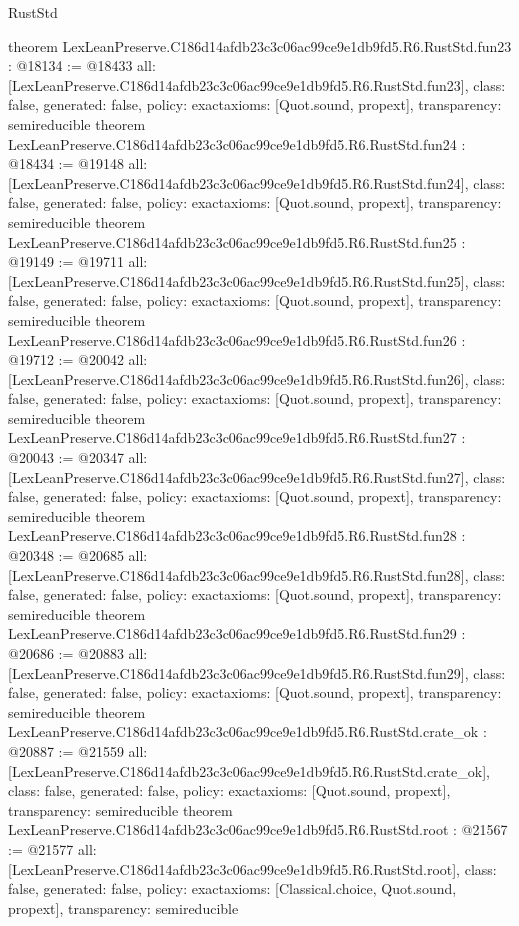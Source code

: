 \begin{lexlean}{RustStd}
\begin{coremodule}
{}
theorem LexLeanPreserve.C186d14afdb23c3c06ac99ce9e1db9fd5.R6.RustStd.fun23 : @18134 := @18433 {
  all: [LexLeanPreserve.C186d14afdb23c3c06ac99ce9e1db9fd5.R6.RustStd.fun23],
  class: false,
  generated: false,
  policy: exact{axioms: [Quot.sound, propext]},
  transparency: semireducible
}
theorem LexLeanPreserve.C186d14afdb23c3c06ac99ce9e1db9fd5.R6.RustStd.fun24 : @18434 := @19148 {
  all: [LexLeanPreserve.C186d14afdb23c3c06ac99ce9e1db9fd5.R6.RustStd.fun24],
  class: false,
  generated: false,
  policy: exact{axioms: [Quot.sound, propext]},
  transparency: semireducible
}
theorem LexLeanPreserve.C186d14afdb23c3c06ac99ce9e1db9fd5.R6.RustStd.fun25 : @19149 := @19711 {
  all: [LexLeanPreserve.C186d14afdb23c3c06ac99ce9e1db9fd5.R6.RustStd.fun25],
  class: false,
  generated: false,
  policy: exact{axioms: [Quot.sound, propext]},
  transparency: semireducible
}
theorem LexLeanPreserve.C186d14afdb23c3c06ac99ce9e1db9fd5.R6.RustStd.fun26 : @19712 := @20042 {
  all: [LexLeanPreserve.C186d14afdb23c3c06ac99ce9e1db9fd5.R6.RustStd.fun26],
  class: false,
  generated: false,
  policy: exact{axioms: [Quot.sound, propext]},
  transparency: semireducible
}
theorem LexLeanPreserve.C186d14afdb23c3c06ac99ce9e1db9fd5.R6.RustStd.fun27 : @20043 := @20347 {
  all: [LexLeanPreserve.C186d14afdb23c3c06ac99ce9e1db9fd5.R6.RustStd.fun27],
  class: false,
  generated: false,
  policy: exact{axioms: [Quot.sound, propext]},
  transparency: semireducible
}
theorem LexLeanPreserve.C186d14afdb23c3c06ac99ce9e1db9fd5.R6.RustStd.fun28 : @20348 := @20685 {
  all: [LexLeanPreserve.C186d14afdb23c3c06ac99ce9e1db9fd5.R6.RustStd.fun28],
  class: false,
  generated: false,
  policy: exact{axioms: [Quot.sound, propext]},
  transparency: semireducible
}
theorem LexLeanPreserve.C186d14afdb23c3c06ac99ce9e1db9fd5.R6.RustStd.fun29 : @20686 := @20883 {
  all: [LexLeanPreserve.C186d14afdb23c3c06ac99ce9e1db9fd5.R6.RustStd.fun29],
  class: false,
  generated: false,
  policy: exact{axioms: [Quot.sound, propext]},
  transparency: semireducible
}
theorem LexLeanPreserve.C186d14afdb23c3c06ac99ce9e1db9fd5.R6.RustStd.crate_ok : @20887 := @21559 {
  all: [LexLeanPreserve.C186d14afdb23c3c06ac99ce9e1db9fd5.R6.RustStd.crate_ok],
  class: false,
  generated: false,
  policy: exact{axioms: [Quot.sound, propext]},
  transparency: semireducible
}
theorem LexLeanPreserve.C186d14afdb23c3c06ac99ce9e1db9fd5.R6.RustStd.root : @21567 := @21577 {
  all: [LexLeanPreserve.C186d14afdb23c3c06ac99ce9e1db9fd5.R6.RustStd.root],
  class: false,
  generated: false,
  policy: exact{axioms: [Classical.choice, Quot.sound, propext]},
  transparency: semireducible
}


\end{coremodule}
\end{lexlean}
